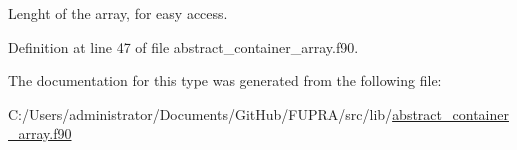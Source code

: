 Lenght of the array, for easy access. 



Definition at line 47 of file abstract\+\_\+container\+\_\+array.\+f90.



The documentation for this type was generated from the following file\+:\begin{DoxyCompactItemize}
\item 
C\+:/\+Users/administrator/\+Documents/\+Git\+Hub/\+F\+U\+P\+R\+A/src/lib/\hyperlink{abstract__container__array_8f90}{abstract\+\_\+container\+\_\+array.\+f90}\end{DoxyCompactItemize}
